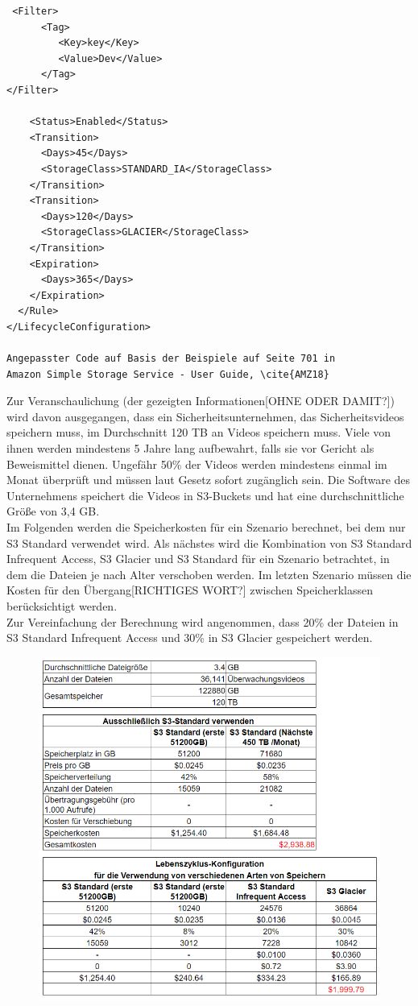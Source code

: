 {\begin{lstlisting}
 <Filter>
      <Tag>
         <Key>key</Key>
         <Value>Dev</Value>
      </Tag>
</Filter>

    <Status>Enabled</Status>
    <Transition>
      <Days>45</Days>
      <StorageClass>STANDARD_IA</StorageClass>
    </Transition>
    <Transition>
      <Days>120</Days>
      <StorageClass>GLACIER</StorageClass>
    </Transition>
    <Expiration>
      <Days>365</Days>
    </Expiration>
  </Rule>
</LifecycleConfiguration>

Angepasster Code auf Basis der Beispiele auf Seite 701 in 
Amazon Simple Storage Service - User Guide, \cite{AMZ18}
\end{lstlisting}

Zur Veranschaulichung (der gezeigten Informationen[OHNE ODER DAMIT?]) wird davon ausgegangen, dass ein Sicherheitsunternehmen, das Sicherheitsvideos speichern muss, im Durchschnitt 120 TB an Videos speichern muss. Viele von ihnen werden mindestens 5 Jahre lang aufbewahrt, falls sie vor Gericht als Beweismittel dienen. Ungefähr 50\% der Videos werden mindestens einmal im Monat überprüft und müssen laut Gesetz sofort zugänglich sein. Die Software des Unternehmens speichert die Videos in S3-Buckets und hat eine durchschnittliche Größe von 3,4 GB.
\\
Im Folgenden werden die Speicherkosten für ein Szenario berechnet, bei dem nur S3 Standard verwendet wird. Als nächstes wird die Kombination von S3 Standard Infrequent Access, S3 Glacier und S3 Standard für ein Szenario betrachtet, in dem die Dateien je nach Alter verschoben werden. Im letzten Szenario müssen die Kosten für den Übergang[RICHTIGES WORT?] zwischen Speicherklassen berücksichtigt werden.
\\
Zur Vereinfachung der Berechnung wird angenommen, dass 20\% der Dateien in S3 Standard Infrequent Access und 30\% in S3 Glacier gespeichert werden.
\\
\begin{figure}[h!]
  \centering
  \includegraphics[scale=0.75]{sources/Kostenvergleich_Nutzung_unt_Speicherklassen}

\end{figure}}
